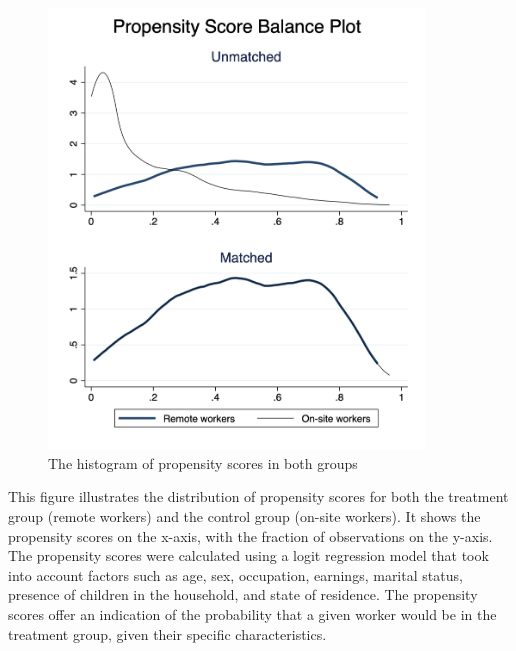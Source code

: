 \documentclass[12pt]{article}
\begin{document}
\begin{figure}[H]  %
\begin{center}
\caption{The histogram of propensity scores in both groups}\label{ps_den}
    \vspace{-0.85em}
    \includegraphics[width=10cm]{ps_den.png}  %
\end{center}
\end{figure}
\vspace{-3em}

\begin{singlespace}
        \begin{footnotesize}
        		 This figure illustrates the distribution of propensity scores for both the treatment group (remote workers) and the control group (on-site workers). It shows the propensity scores on the x-axis, with the fraction of observations on the y-axis. The propensity scores were calculated using a logit regression model that took into account factors such as age, sex, occupation, earnings, marital status, presence of children in the household, and state of residence. The propensity scores offer an indication of the probability that a given worker would be in the treatment group, given their specific characteristics.
        \end{footnotesize}
\end{singlespace}
\end{document}
